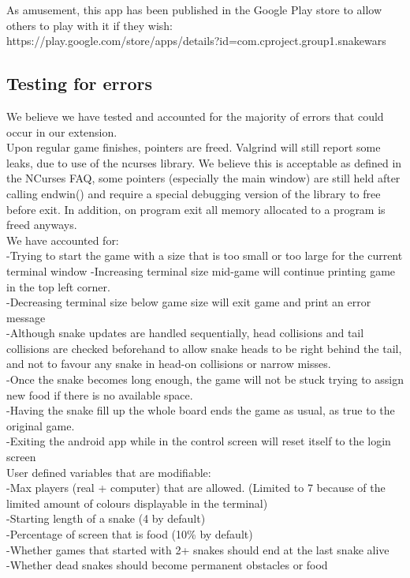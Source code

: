 \documentclass{article}
\begin{document}
As amusement, this app has been published in the Google Play store to allow others to play with it if they wish:\\
https://play.google.com/store/apps/details?id=com.cproject.group1.snakewars\\

\subsection{Testing for errors}
We believe we have tested and accounted for the majority of errors that could occur in our extension.\\

Upon regular game finishes, pointers are freed. Valgrind will still report some leaks, due to use of the ncurses library. We believe this is acceptable as defined in the NCurses FAQ, some pointers (especially the main window) are still held after calling endwin() and require a special debugging version of the library to free before exit. In addition, on program exit all memory allocated to a program is freed anyways.\\

We have accounted for:\\
-Trying to start the game with a size that is too small or too large for the current terminal window
-Increasing terminal size mid-game will continue printing game in the top left corner.\\  
-Decreasing terminal size below game size will exit game and print an error message\\
-Although snake updates are handled sequentially, head collisions and tail collisions are checked beforehand to allow snake heads to be right behind the tail, and not to favour any snake in head-on collisions or narrow misses.\\
-Once the snake becomes long enough, the game will not be stuck trying to assign new food if there is no available space.\\
-Having the snake fill up the whole board ends the game as usual, as true to the original game.\\
-Exiting the android app while in the control screen will reset itself to the login screen\\

User defined variables that are modifiable:\\
-Max players (real + computer) that are allowed. (Limited to 7 because of the limited amount of colours displayable in the terminal)\\
-Starting length of a snake (4 by default)\\
-Percentage of screen that is food (10\% by default)\\
-Whether games that started with 2+ snakes should end at the last snake alive\\
-Whether dead snakes should become permanent obstacles or food\\
\end{document}
